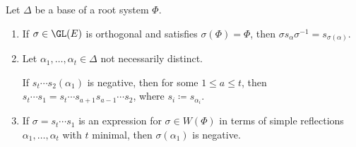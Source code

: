 Let $\Delta$ be a base of a root system $\Phi$.
\begin{enumerate}[label=(\alph*)]
	\item If $\sigma \in \GL(E)$ is orthogonal and satisfies $\sigma(\Phi) = \Phi$, then
		$\sigma s_\alpha \sigma^{-1} = s_{\sigma(\alpha)}$.
	\item Let $\alpha_1, \ldots, \alpha_t \in \Delta$ not necessarily
		distinct.

		If $s_t\cdots s_2(\alpha_1)$ is negative, then for some $1\leq a\leq t$,
		then $s_t\cdots s_1 = s_t\cdots s_{a+1}s_{a-1}\cdots s_2$,
		where $s_i\coloneqq s_{\alpha_i}$.

	\item If $\sigma = s_t\cdots s_1$ is an expression for $\sigma \in W(\Phi)$
		in terms of simple reflections $\alpha_1, \ldots, \alpha_t$ with
		$t$ minimal, then $\sigma(\alpha_1)$ is negative.
\end{enumerate}
